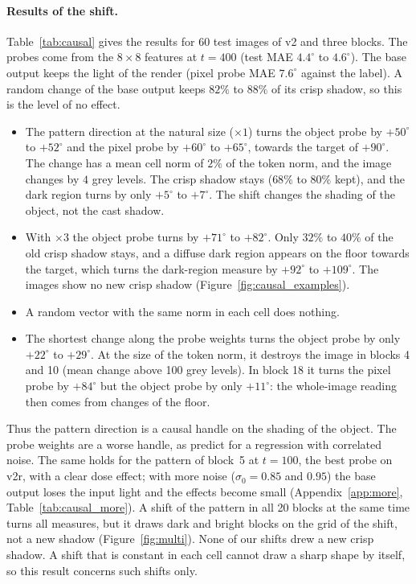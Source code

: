 \documentclass[10pt]{article}
\newcommand{\degr}{^\circ}
\begin{document}
\paragraph{Results of the shift.}
Table~\ref{tab:causal} gives the results for 60 test images of v2 and three blocks.
The probes come from the $8\times8$ features at $t=400$ (test MAE $4.4\degr$ to $4.6\degr$).
The base output keeps the light of the render (pixel probe MAE $7.6\degr$ against the label).
A random change of the base output keeps $82\%$ to $88\%$ of its crisp shadow, so this is the level of no effect.
\begin{itemize}
    \item The pattern direction at the natural size ($\times1$) turns the object probe by $+50\degr$ to $+52\degr$ and the pixel probe by $+60\degr$ to $+65\degr$, towards the target of $+90\degr$. The change has a mean cell norm of $2\%$ of the token norm, and the image changes by $4$ grey levels. The crisp shadow stays ($68\%$ to $80\%$ kept), and the dark region turns by only $+5\degr$ to $+7\degr$. The shift changes the shading of the object, not the cast shadow.
    \item With $\times3$ the object probe turns by $+71\degr$ to $+82\degr$. Only $32\%$ to $40\%$ of the old crisp shadow stays, and a diffuse dark region appears on the floor towards the target, which turns the dark-region measure by $+92\degr$ to $+109\degr$. The images show no new crisp shadow (Figure~\ref{fig:causal_examples}).
    \item A random vector with the same norm in each cell does nothing.
    \item The shortest change along the probe weights turns the object probe by only $+22\degr$ to $+29\degr$. At the size of the token norm, it destroys the image in blocks 4 and 10 (mean change above 100 grey levels). In block 18 it turns the pixel probe by $+84\degr$ but the object probe by only $+11\degr$: the whole-image reading then comes from changes of the floor.
\end{itemize}
Thus the pattern direction is a causal handle on the shading of the object. The probe weights are a worse handle, as \citet{haufe2014interpretation} predict for a regression with correlated noise.
The same holds for the pattern of block~5 at $t=100$, the best probe on v2r, with a clear dose effect; with more noise ($\sigma_0=0.85$ and $0.95$) the base output loses the input light and the effects become small (Appendix~\ref{app:more}, Table~\ref{tab:causal_more}).
A shift of the pattern in all 20 blocks at the same time turns all measures, but it draws dark and bright blocks on the grid of the shift, not a new shadow (Figure~\ref{fig:multi}).
None of our shifts drew a new crisp shadow. A shift that is constant in each cell cannot draw a sharp shape by itself, so this result concerns such shifts only.
\end{document}

